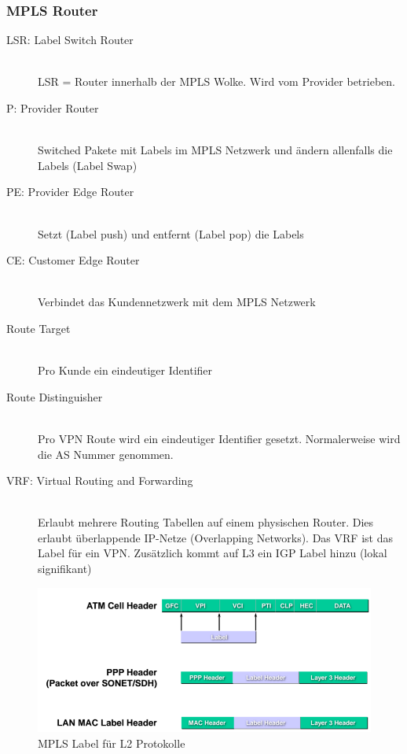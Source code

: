 \subsubsection{MPLS Router}
\begin{description}
	\item[LSR: Label Switch Router] \hfill \\ LSR = Router innerhalb der MPLS Wolke. Wird vom Provider betrieben.
	\item[P: Provider Router] \hfill \\
	Switched Pakete mit Labels im MPLS Netzwerk und ändern allenfalls die Labels (Label Swap)
	\item[PE: Provider Edge Router] \hfill \\
 Setzt (Label push) und entfernt (Label pop) die Labels
	\item[CE: Customer Edge Router] \hfill \\
	Verbindet das Kundennetzwerk mit dem MPLS Netzwerk
	\item[Route Target] \hfill \\
	Pro Kunde ein eindeutiger Identifier
	\item[Route Distinguisher] \hfill \\ 
	Pro VPN Route wird ein eindeutiger Identifier gesetzt. Normalerweise wird die AS Nummer genommen.
	\item[VRF: Virtual Routing and Forwarding] \hfill \\ Erlaubt mehrere Routing Tabellen auf einem physischen Router. Dies erlaubt überlappende IP-Netze (Overlapping Networks). Das VRF ist das Label für ein VPN. Zusätzlich kommt auf L3 ein IGP Label hinzu (lokal signifikant)	
\end{description}

\begin{figure}[h]
	\centering
	\includegraphics[width=0.7\linewidth]{images/mpls_label.png}
	\caption{MPLS Label für L2 Protokolle}
\end{figure}

